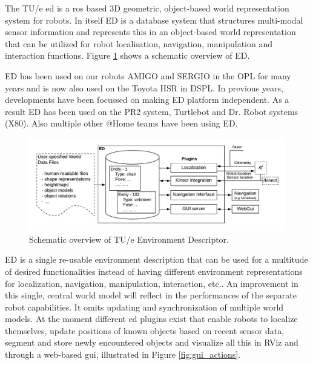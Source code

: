 \label{sec:ed}
The TU/e \acrfull{ed} is a \acrfull{ros} based 3D geometric, object-based world representation system for robots. In itself ED is a database system that structures multi-modal sensor information and represents this in an object-based world representation that can be utilized for robot localisation, navigation, manipulation and interaction functions. Figure \ref{fig:ed} shows a schematic overview of ED.

ED has been used on our robots AMIGO and SERGIO in the OPL for many years and is now also used on the Toyota HSR in DSPL. In previous years, developments have been focussed on making ED platform independent. As a result ED has been used on the PR2 system, Turtlebot and Dr. Robot systems (X80). Also multiple other @Home teams have been using ED.
\begin{figure}[h]
	\includegraphics[width = 0.9\linewidth]{Figures/ed_overview}
	\caption{Schematic overview of TU/e Environment Descriptor.}
	\label{fig:ed}
\end{figure}
ED is a single re-usable environment description that can be used for a multitude of desired functionalities instead of having different environment representations for localization, navigation, manipulation, interaction, etc.. An improvement in this single, central world model will reflect in the performances of the separate robot capabilities. It omits updating and synchronization of multiple world models. At the moment different \acrshort{ed} plugins exist that enable robots to localize themselves, update positions of known objects based on recent sensor data, segment and store newly encountered objects and visualize all this in RViz and through a web-based \acrshort{gui}, illustrated in Figure \ref{fig:gui_actions}.
